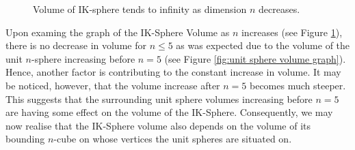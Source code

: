 \begin{figure}[H]
    \centering
    \caption{Volume of IK-sphere tends to infinity as dimension $n$ decreases.}
    \label{fig:IK sphere volume to infinity graph}
\end{figure}

Upon examing the graph of the IK-Sphere Volume as $n$ increases (see Figure \ref{fig:IK sphere volume to infinity graph}), there is no decrease in volume for $n \leq 5$ as was expected due to the volume of the unit $n$-sphere increasing before $n=5$ (see Figure \ref{fig:unit sphere volume graph}). Hence, another factor is contributing to the constant increase in volume. It may be noticed, however, that the volume increase after $n=5$ becomes much steeper. This suggests that the surrounding unit sphere volumes increasing before $n=5$ are having some effect on the volume of the IK-Sphere. Consequently, we may now realise that the IK-Sphere volume also depends on the volume of its bounding $n$-cube on whose vertices the unit spheres are situated on. 

